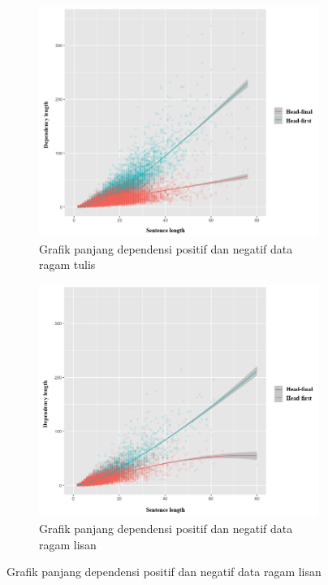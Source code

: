 \documentclass[10pt, a4paper, conference, compsocconf]{IEEEtran}
\begin{document}
\begin{figure}
\centering

\begin{subfigure}{.7\linewidth}
  \centering
  \includegraphics[width=1\linewidth] {pics/tulis_DLposneg.png} 
	\caption{Grafik panjang dependensi positif dan negatif data ragam tulis}
	\label{fig:tulis_DLposneg} 
\end{subfigure}
%
\begin{subfigure}{.7\linewidth}
  \centering
  \includegraphics[width=1\linewidth]{pics/lisan_DLposneg.png} 
	\caption{Grafik panjang dependensi positif dan negatif data ragam lisan}
	\label{fig:lisan_DLposneg} 
\end{subfigure}


\end{figure}
\end{document}
